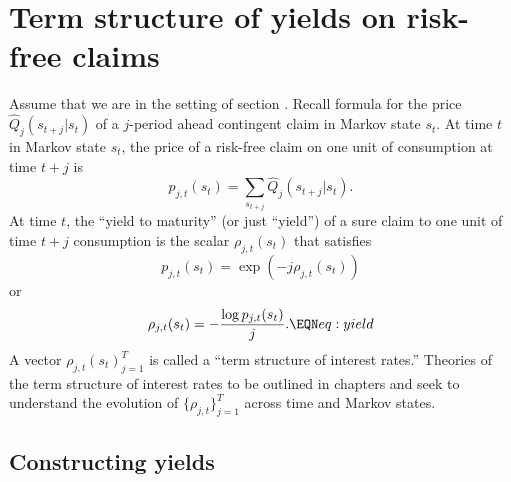 \section{Term structure of yields on risk-free claims}\label{sec:term_structure_LA}%
Assume that we are in the setting of section 
.
Recall formula  for the price 
$\hat Q_j(s_{t+j} | s_t)$ of a $j$-period ahead 
contingent claim in Markov state
$s_t$.  At time $t$ in Markov state $s_t$, the price of a risk-free claim on  one unit of consumption at time $t+j$ is
$$ p_{j,t}(s_t) = \sum_{s_{t+j} } \hat Q_j(s_{t+j} | s_t) . $$
At time $t$, the  ``yield to maturity'' (or just ``yield'') of a sure claim to one unit of time $t+j$ consumption is
the scalar $\rho_{j,t}(s_t)$ that satisfies 
$$ p_{j,t}(s_t) = \exp( -j \rho_{j,t}(s_t)) $$
or
$$ \rho_{j,t}(s_t) = - {\frac{\log p_{j,t}(s_t)}{j}}.  \EQN eq:yield $$
A vector  $\rho_{j,t}(s_t)_{j=1}^T$ is  called a ``term structure of interest rates.''
Theories of  the term structure of interest rates to be outlined in chapters  and 
seek to understand the evolution of $\{\rho_{j,t} \}_{j=1}^T$  across  time and Markov states.

\subsection{Constructing yields}

